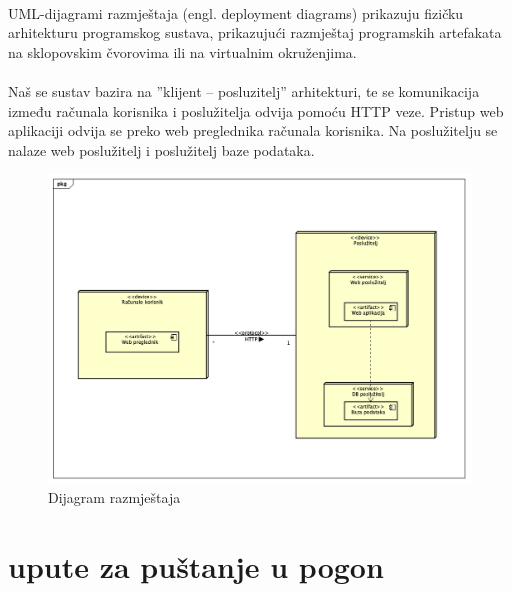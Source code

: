 \paragraph{}{
UML-dijagrami razmještaja (engl. deployment diagrams) prikazuju fizičku arhitekturu programskog sustava, prikazujući razmještaj programskih artefakata na sklopovskim čvorovima ili na virtualnim okruženjima.
}

\paragraph{}{
Naš se sustav bazira na ”klijent – posluzitelj” arhitekturi, te se komunikacija između računala korisnika i poslužitelja odvija pomoću HTTP veze. Pristup web aplikaciji odvija se preko web preglednika računala korisnika. Na poslužitelju se nalaze web poslužitelj i poslužitelj baze podataka.
}

\begin{figure}[!htb]
	\centering
	\includegraphics[width=1\linewidth]{dijagrami/DijagramRazmjestaja.png}
	\caption{Dijagram razmještaja}
	\label{fig:modelsdiagram}
\end{figure}

\section{upute za puštanje u pogon}


\eject